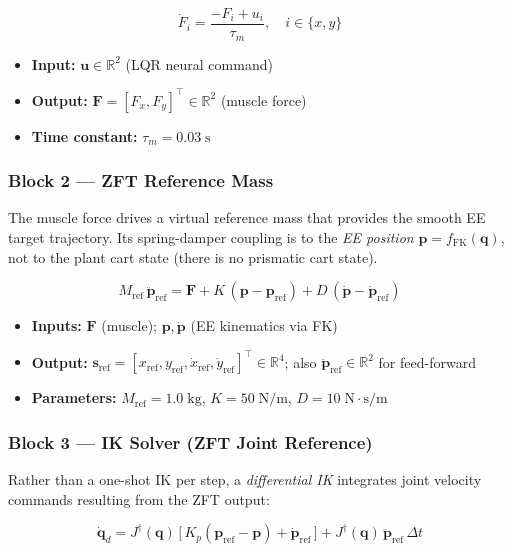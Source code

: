 \documentclass[11pt, a4paper]{article}
\begin{document}
\[
\boxed{
\dot{F}_i = \frac{-F_i + u_i}{\tau_m}, \quad i \in \{x, y\}
}
\]

\begin{itemize}
  \item \textbf{Input:} $\bm{u} \in \mathbb{R}^2$ (LQR neural command)
  \item \textbf{Output:} $\bm{F} = [F_x, F_y]^{\top} \in \mathbb{R}^2$ (muscle force)
  \item \textbf{Time constant:} $\tau_m = 0.03\;\mathrm{s}$
\end{itemize}

\subsubsection*{Block 2 — ZFT Reference Mass}

The muscle force drives a virtual reference mass that provides the smooth EE
target trajectory.  Its spring-damper coupling is to the \emph{EE position}
$\bm{p} = f_{\mathrm{FK}}(\bm{q})$, not to the plant cart state (there is no
prismatic cart state).

\[
\boxed{
M_{\mathrm{ref}}\,\ddot{\bm{p}}_{\mathrm{ref}}
= \bm{F}
+ K\,(\bm{p} - \bm{p}_{\mathrm{ref}})
+ D\,(\dot{\bm{p}} - \dot{\bm{p}}_{\mathrm{ref}})
}
\]

\begin{itemize}
  \item \textbf{Inputs:} $\bm{F}$ (muscle); $\bm{p}, \dot{\bm{p}}$ (EE kinematics via FK)
  \item \textbf{Output:} $\bm{s}_{\mathrm{ref}} = [x_{\mathrm{ref}}, y_{\mathrm{ref}},
        \dot{x}_{\mathrm{ref}}, \dot{y}_{\mathrm{ref}}]^{\top} \in \mathbb{R}^4$;
        also $\ddot{\bm{p}}_{\mathrm{ref}} \in \mathbb{R}^2$ for feed-forward
  \item \textbf{Parameters:} $M_{\mathrm{ref}} = 1.0\;\mathrm{kg}$,
        $K = 50\;\mathrm{N/m}$, $D = 10\;\mathrm{N\cdot s/m}$
\end{itemize}

\subsubsection*{Block 3 — IK Solver (ZFT Joint Reference)}

Rather than a one-shot IK per step, a \emph{differential IK} integrates joint
velocity commands resulting from the ZFT output:

\[
\boxed{
\dot{\bm{q}}_d = J^{\dagger}(\bm{q})\,
\bigl[\,K_p(\bm{p}_{\mathrm{ref}} - \bm{p}) + \dot{\bm{p}}_{\mathrm{ref}}\,\bigr]
+ J^{\dagger}(\bm{q})\,\ddot{\bm{p}}_{\mathrm{ref}}\,\Delta t
}
\]
\end{document}
